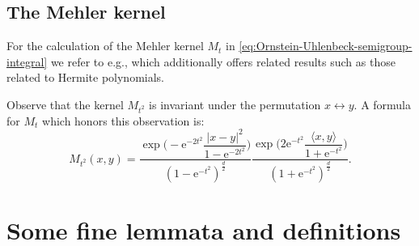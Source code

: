 \documentclass[a4paper,oneside,10pt]{amsproc}
\theoremstyle{plain}
\theoremstyle{remark}
\theoremstyle{definition}
\newcommand{\la}{\langle}
\newcommand{\ra}{\rangle}
\newcommand{\e}{\mathrm{e}} %
\begin{document}
\subsection{The Mehler kernel}
For the calculation of the Mehler kernel $M_t$ in
\eqref{eq:Ornstein-Uhlenbeck-semigroup-integral} we refer to e.g.,
\textcite{Sjogren1997} which additionally offers related results such
as those related to Hermite polynomials.

Observe that the kernel $M_{t^2}$ is invariant under the permutation
$x \leftrightarrow y$. A formula for $M_t$ which honors this
observation is:
\begin{equation}
  \label{eq:Mehler-kernel}
  M_{t^2}(x, y) = \frac{\exp\biggl(-\e^{-2t^2} \dfrac{|x - y|^2}{1
      - \e^{-2 t^2}}  \biggr)}{(1 - \e^{-t^2})^{\frac{d}2}}
  \frac{\exp\biggl(2\e^{-t^2} \dfrac{\la x, y \ra}{1 + \e^{-t^2}}
    \biggr)}{(1 + \e^{-t^2})^{\frac{d}2}}.
\end{equation}

\section{Some fine lemmata and definitions}
\end{document}
